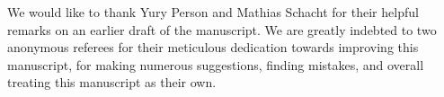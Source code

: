 \documentclass[11pt,reqno]{amsart}
\newcommand{\ppoints}[1]{%
\begin{tikzpicture}[inner sep = 1pt, #1]%
\node (1) at (0,-2) [aNode]{};
\node (3) at (1.5,-2) [aNode]{};
\node (2) at (0.75,-1) [aNode]{};
\end{tikzpicture}%
}
\def\points{\ppoints{scale=0.13}}
\begin{document}
%
%
%

\vspace{3ex}
\noindent
{\large {}} We would like to thank Yury Person and Mathias Schacht for their helpful remarks on an earlier draft of the manuscript. We are greatly indebted to two anonymous referees for their meticulous dedication towards improving this manuscript, for making numerous suggestions, finding mistakes, and overall treating this manuscript as their own. 





\end{document}
